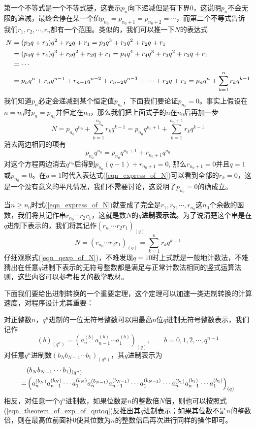 第一个不等式是一个不等式链，这表示$p_n$向下递减但是有下界0，这说明$p_n$不会无限的递减，最终会停在某一个值$p_{n_0}=p_{n_0+1}=p_{n_0+2}=\cdots$，而第二个不等式告诉我们$r_1,r_2,\cdots,r_n$都有一个范围。类似的，我们可以推一下$N$的表达式
\begin{align}
        N&=(p_3q+r_3)q^2+r_2q+r_1=p_3q^3+r_3q^2+r_2q+r_1\notag\\
        &=(p_4q+r_4)q^3+r_3q^2+r_2q+r_1=p_4q^4+r_4q^3+r_3q^2+r_2q+r_1\notag\\
        &=\cdots\notag\\
        &=p_nq^n+r_nq^{n-1}+r_{n-1}q^{n-2}+r_{n-2}q^{n-3}+\cdots+r_2q+r_1=p_nq^n+\sum_{k=1}^n r_kq^{k-1}\label{eqn_express_of_N}
\end{align}
我们知道$p_n$必定会递减到某个恒定值$p_{n_0}$，下面我们要论证$p_{n_0}=0$。事实上假设在$n=n_0$时$p_n=p_{n_0}$并恒定在$n_0$，那么我们把上面式子的$n$在$n_0$后再加一步
$$N=p_{n_0}q^{n_0}+\sum_{k=1}^{n_0}r_kq^{k-1}=p_{n_0}q^{n_0+1}+\sum_{k=1}^{n_0+1}r_kq^{k-1}$$
消去两边相同的项有
$$p_{n_0}q^{n_0}=p_{n_0}q^{n_0+1}+r_{n_0+1}q^{n_0}$$
对这个方程两边消去$q^{n_0}$后得到$p_{n_0}(q-1)+r_{n_0+1}=0$, 那么$r_{n_0+1}=0$并且$q=1$或$p_{n_0}=0$。在$q=1$时代入表达式(\ref{eqn_express_of_N})可以看到全部的$r_{k}=0$，这是一个没有意义的平凡情况，我们不需要讨论，这说明了$p_{n_0}=0$的确成立。
\par 当$n\geq n_0$时式(\ref{eqn_express_of_N})就变成了完全是$r_1,r_2,\cdots,r_{n_0}$这$n_0$个余数的函数，我们将其记作串$r_{n_0}\cdots r_2r_1$，这就是数$N$的\textbf{$q$进制表示法}。为了说清楚这个串是在$q$进制下表示的，我们将其记作$(r_{n_0}\cdots r_2r_1)_{(q)}$
\begin{equation}\label{eqn_qexp_of_N}
    N=(r_{n_0}\cdots r_2r_1)_{(q)}=\sum_{k=1}^n r_kq^{k-1}
\end{equation}
仔细观察式(\ref{eqn_qexp_of_N})，不难发现$q=10$时上式就是一般地计数法，不难猜出在任意$q$进制下表示的无符号整数都是满足与正常计数法相同的竖式运算法则，这些内容可以参考相关的数学教材。
\par 下面我们要给出进制转换的一个重要定理，这个定理可以加速一类进制转换的计算速度，对程序设计尤其重要：
\begin{theorem*}
    对正整数$n$，$q^n$进制的一位无符号整数可以用最高$n$位$q$进制无符号整数表示，我们记作
    \begin{equation}
        (b)_{(q^n)}=\left(a^{(b)}_{n}a^{(b)}_{n-1}\cdots a^{(b)}_1\right)_{(q)},\qquad b=0,1,2,\cdots,q^{n-1}\label{eqn_theorem_of_exp_of_qntoq_1bit}
    \end{equation}
    对任意$q^n$进制数$(b_Nb_{N-1}\cdots b_1)_{(q^n)}$，其$q$进制表示为
    \begin{align}
        &(b_Nb_{N-1}\cdots b_1)_{(q^n)}\notag\\=&\left(a^{(b_N)}_{n}a^{(b_N)}_{n-1}\cdots a^{(b_N)}_1a^{(b_{N-1})}_{n}a^{(b_{N-1})}_{n-1}\cdots a^{(b_{N-1})}_1\cdots a^{(b_1)}_{n}a^{(b_1)}_{n-1}\cdots a^{(b_1)}_1\right)_{(q)}\label{eqn_theorem_of_exp_of_qntoq}
    \end{align}
    相反，对任意一个$q^n$进制数，如果位数是$n$的整数倍$N$倍，则也可以按照式(\ref{eqn_theorem_of_exp_of_qntoq})反推出其$q$进制表示；如果其位数不是$n$的整数倍，则在最高位前面补0使其位数为$n$的整数倍后再次进行同样的操作即可。
\end{theorem*}
